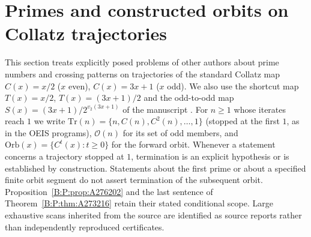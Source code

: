 \documentclass[11pt,a4paper]{article}
\theoremstyle{definition}
\theoremstyle{remark}
\numberwithin{equation}{section}
\begin{document}
\section{Primes and constructed orbits on Collatz trajectories}\label{B:P:sec}
\providecommand{\Traj}{\mathrm{Tr}}
\providecommand{\Orb}{\mathrm{Orb}}
\providecommand{\Od}{\mathcal{O}}

This section treats explicitly posed problems of other authors about prime
numbers and crossing patterns on trajectories of the standard Collatz map
$C(x)=x/2$ ($x$ even), $C(x)=3x+1$ ($x$ odd). We also use the shortcut map
$T(x)=x/2$, $T(x)=(3x+1)/2$ and the odd-to-odd map
$S(x)=(3x+1)/2^{v_2(3x+1)}$ of the manuscript \cite{R021}. For $n\ge1$ whose
iterates reach $1$ we write $\Traj(n)=\{n,C(n),C^2(n),\dots,1\}$ (stopped at the
first $1$, as in the OEIS programs), $\Od(n)$ for its set of odd members, and
$\Orb(x)=\{C^t(x):t\ge0\}$ for the forward orbit. Whenever a statement concerns a trajectory stopped at $1$, termination is
an explicit hypothesis or is established by construction. Statements about
the first prime or about a specified finite orbit segment do not assert
termination of the subsequent orbit. Proposition~\ref{B:P:prop:A276202} and the
last sentence of Theorem~\ref{B:P:thm:A273216} retain their stated conditional
scope. Large exhaustive scans inherited from the source are identified as
source reports rather than independently reproduced certificates.
\end{document}
